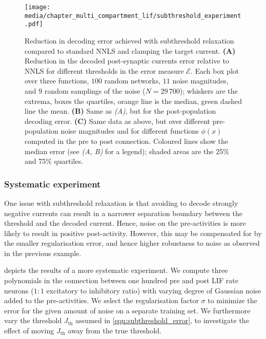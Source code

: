 \begin{figure}[t]
	\texttt{[image: media/chapter\_multi\_compartment\_lif/subthreshold\_experiment.pdf]}%
	{\label{fig:subthreshold_experiment_a}}%
	{\label{fig:subthreshold_experiment_b}}%
	{\label{fig:subthreshold_experiment_c}}%
	\caption[Reduction in decoding error achieved with subthreshold relaxation]{Reduction in decoding error achieved with subthreshold relaxation compared to standard NNLS and clamping the target current.
	\textbf{(A)} Reduction in the decoded post-synaptic currents error relative to NNLS for different thresholds in the error measure $\mathcal{E}$.
	Each box plot over three functions, $100$ random networks, $11$ noise magnitudes, and $9$ random samplings of the noise ($N = 29\,700$); whiskers are the extrema, boxes the quartiles, orange line is the median, green dashed line the mean.
	\textbf{(B)}
	Same as \emph{(A)}, but for the post-population decoding error.
	\textbf{(C)} Same data as above, but over different pre-population noise magnitudes and for different functions $\phi(x)$ computed in the pre to post connection.
	Coloured lines show the median error (see \emph{(A, B)} for a legend); shaded areas are the 25\% and 75\% quartiles.
	}
	\label{fig:subthreshold_experiment}
\end{figure}

\subsubsection{Systematic experiment}
One issue with subthreshold relaxation is that avoiding to decode strongly negative currents can result in a narrower separation boundary between the threshold and the decoded current.
Hence, noise on the pre-activities is more likely to result in positive post-activity.
However, this may be compensated for by the smaller regularisation error, and hence higher robustness to noise as observed in the previous example.

 depicts the results of a more systematic experiment.
We compute three polynomials in the connection between one hundred pre and post LIF rate neurons ($1\!\!:\!\!1$ excitatory to inhibitory ratio) with varying degree of Gaussian noise added to the pre-activities.
We select the regularisation factor $\sigma$ to minimize the error for the given amount of noise on a separate training set.
We furthermore vary the threshold $J_\mathrm{th}$ assumed in \cref{eqn:subthreshold_error}, to investigate the effect of moving $J_\mathrm{th}$ away from the true threshold.

